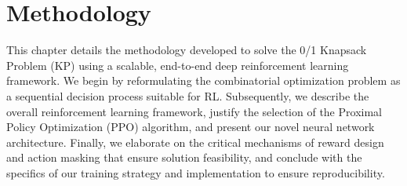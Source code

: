 \chapter{Methodology}
\label{chap:methodology}

This chapter details the methodology developed to solve the 0/1 Knapsack Problem (KP) using a scalable, end-to-end deep reinforcement learning framework.
We begin by reformulating the combinatorial optimization problem as a sequential decision process suitable for RL.
Subsequently, we describe the overall reinforcement learning framework, justify the selection of the Proximal Policy Optimization (PPO) algorithm, and present our novel neural network architecture.
Finally, we elaborate on the critical mechanisms of reward design and action masking that ensure solution feasibility, and conclude with the specifics of our training strategy and implementation to ensure reproducibility.

